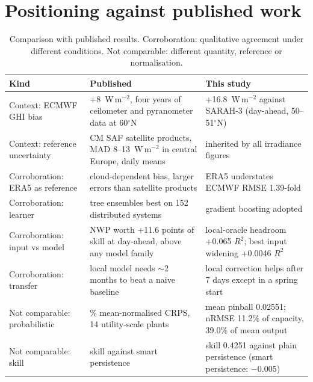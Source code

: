 \section{Positioning against published work}
\label{sec:s-position}

\begin{table}[H]
\centering
\caption{Comparison with published results. Corroboration: qualitative agreement under different conditions. Not comparable: different quantity, reference or normalisation.}
\label{tab:s-position}
\small
\begin{tabularx}{\textwidth}{@{}>{\raggedright\arraybackslash}p{2.6cm} >{\raggedright\arraybackslash}X >{\raggedright\arraybackslash}X@{}}
\toprule
Kind & Published & This study \\
\midrule
Context: ECMWF GHI bias & +8~W\,m$^{-2}$, four years of ceilometer and pyranometer data at 60$^\circ$N \citep{Tuononen2019} & +16.8~W\,m$^{-2}$ against SARAH-3 (day-ahead, 50--51$^\circ$N) \\
Context: reference uncertainty & CM SAF satellite products, MAD 8--13~W\,m$^{-2}$ in central Europe, daily means \citep{Urraca2017} & inherited by all irradiance figures \\
Corroboration: ERA5 as reference & cloud-dependent bias, larger errors than satellite products \citep{Urraca2018} & ERA5 understates ECMWF RMSE 1.39-fold \\
Corroboration: learner & tree ensembles best on 152 distributed systems \citep{Visser2019} & gradient boosting adopted \\
Corroboration: input vs model & NWP worth +11.6 points of skill at day-ahead, above any model family \citep{Nguyen2026} & local-oracle headroom +0.065 $R^2$; best input widening +0.0046 $R^2$ \\
Corroboration: transfer & local model needs $\sim$2 months to beat a naive baseline \citep{Depoortere2025} & local correction helps after 7 days except in a spring start \\
Not comparable: probabilistic & 18.4\% mean-normalised CRPS, 14 utility-scale plants \citep{MayerYang2023} & mean pinball 0.02551; nRMSE 11.2\% of capacity, 39.0\% of mean output \\
Not comparable: skill & skill against smart persistence \citep{Visser2019} & skill 0.4251 against plain persistence (smart persistence: $-0.005$) \\
\bottomrule
\end{tabularx}
\end{table}

